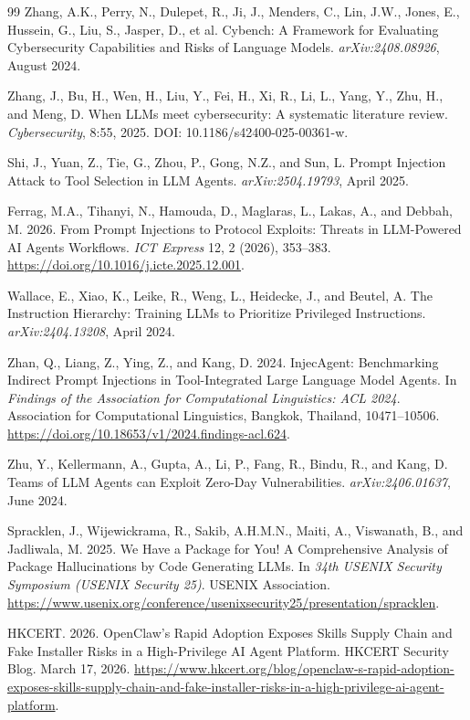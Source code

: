 \documentclass[sigconf,nonacm]{acmart}
\begin{document}
\begin{thebibliography}{99}
Zhang, A.K., Perry, N., Dulepet, R., Ji, J., Menders, C., Lin, J.W., Jones, E., Hussein, G., Liu, S., Jasper, D., et al. Cybench: A Framework for Evaluating Cybersecurity Capabilities and Risks of Language Models. \textit{arXiv:2408.08926}, August 2024.

Zhang, J., Bu, H., Wen, H., Liu, Y., Fei, H., Xi, R., Li, L., Yang, Y., Zhu, H., and Meng, D. When LLMs meet cybersecurity: A systematic literature review. \textit{Cybersecurity}, 8:55, 2025. DOI: 10.1186/s42400-025-00361-w.

Shi, J., Yuan, Z., Tie, G., Zhou, P., Gong, N.Z., and Sun, L. Prompt Injection Attack to Tool Selection in LLM Agents. \textit{arXiv:2504.19793}, April 2025.

Ferrag, M.A., Tihanyi, N., Hamouda, D., Maglaras, L., Lakas, A., and Debbah, M. 2026. From Prompt Injections to Protocol Exploits: Threats in LLM-Powered AI Agents Workflows. \textit{ICT Express} 12, 2 (2026), 353--383. \url{https://doi.org/10.1016/j.icte.2025.12.001}.

Wallace, E., Xiao, K., Leike, R., Weng, L., Heidecke, J., and Beutel, A. The Instruction Hierarchy: Training LLMs to Prioritize Privileged Instructions. \textit{arXiv:2404.13208}, April 2024.

Zhan, Q., Liang, Z., Ying, Z., and Kang, D. 2024. InjecAgent: Benchmarking Indirect Prompt Injections in Tool-Integrated Large Language Model Agents. In \textit{Findings of the Association for Computational Linguistics: ACL 2024}. Association for Computational Linguistics, Bangkok, Thailand, 10471--10506. \url{https://doi.org/10.18653/v1/2024.findings-acl.624}.

Zhu, Y., Kellermann, A., Gupta, A., Li, P., Fang, R., Bindu, R., and Kang, D. Teams of LLM Agents can Exploit Zero-Day Vulnerabilities. \textit{arXiv:2406.01637}, June 2024.

Spracklen, J., Wijewickrama, R., Sakib, A.H.M.N., Maiti, A., Viswanath, B., and Jadliwala, M. 2025. We Have a Package for You! A Comprehensive Analysis of Package Hallucinations by Code Generating LLMs. In \textit{34th USENIX Security Symposium (USENIX Security 25)}. USENIX Association. \url{https://www.usenix.org/conference/usenixsecurity25/presentation/spracklen}.

HKCERT. 2026. OpenClaw's Rapid Adoption Exposes Skills Supply Chain and Fake Installer Risks in a High-Privilege AI Agent Platform. HKCERT Security Blog. March 17, 2026. \url{https://www.hkcert.org/blog/openclaw-s-rapid-adoption-exposes-skills-supply-chain-and-fake-installer-risks-in-a-high-privilege-ai-agent-platform}.


\end{thebibliography}
\end{document}
